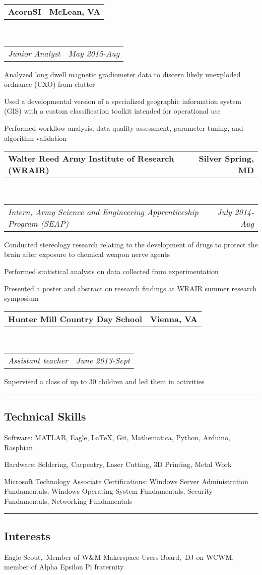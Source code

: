 \documentclass[10pt,letterpaper]{article}
\makeatletter
\newenvironment{indentsection}[1]%
{\begin{list}{}%
	{\setlength{\leftmargin}{#1}}%
	\item[]%
}
{\end{list}}
\newcommand{\headerrow}[2]
{\begin{tabular*}{\linewidth}{l@{\extracolsep{\fill}}r}
	#1 &
	#2 \\
\end{tabular*}}
\makeatother
\begin{document}
	\headerrow
		{\textbf{AcornSI}}
		{\textbf{McLean, VA}}
	\\
	\headerrow
		{\emph{Junior Analyst}}
		{\emph{May 2015-Aug}}
	\begin{itemize*}
		\item Analyzed long dwell magnetic gradiometer data to
			discern likely unexploded ordnance (UXO) from clutter
		\item Used a developmental version of a specialized geographic information system (GIS) with 			a custom classification toolkit intended for operational use
		\item Performed workflow analysis, data
quality assessment, parameter tuning, and algorithm validation
	\end{itemize*}
	\headerrow
		{\textbf{Walter Reed Army Institute of Research (WRAIR)}}
		{\textbf{Silver Spring, MD}}
	\\
	\headerrow
		{\emph{Intern, Army Science and Engineering Apprenticeship Program (SEAP)}}
		{\emph{July 2014-Aug}}
	\begin{itemize*}
		\item Conducted stereology research relating to the development of drugs to protect the brain after 		exposure to chemical weapon nerve agents
		\item Performed statistical analysis on data collected from experimentation
		\item Presented a poster and abstract on research findings at WRAIR summer research symposium
	\end{itemize*}
	\headerrow
		{\textbf{Hunter Mill Country Day School}}
		{\textbf{Vienna, VA}}
	\\
	\headerrow
		{\emph{Assistant teacher}}
		{\emph{June 2013-Sept}}
	\begin{itemize*}
		\item Supervised a class of up to 30 children and led them in activities
	\end{itemize*}

\hrule
\vspace{-0.4em}
\subsection*{Technical Skills}

\begin{indentsection}{\parindent}
\begin{description*}
	\item[Software:]
	MATLAB, Eagle, \LaTeX, Git, Mathematica, Python, Arduino, Raspbian
	\item[Hardware:]
	Soldering, Carpentry, Laser Cutting, 3D Printing, Metal Work
	\item[Microsoft Technology Associate Certifications:]
	\hfill \break
	Windows Server Administration Fundamentals,
	Windows Operating System Fundamentals,
	Security Fundamentals,
	Networking Fundamentals
\end{description*}
\end{indentsection}

\hrule
\vspace{-0.4em}
\subsection*{Interests}
\indent Eagle Scout,\, Member of W\&M Makerspace Users Board,\, DJ on WCWM,\, member of Alpha Epsilon Pi fraternity
\end{document}
